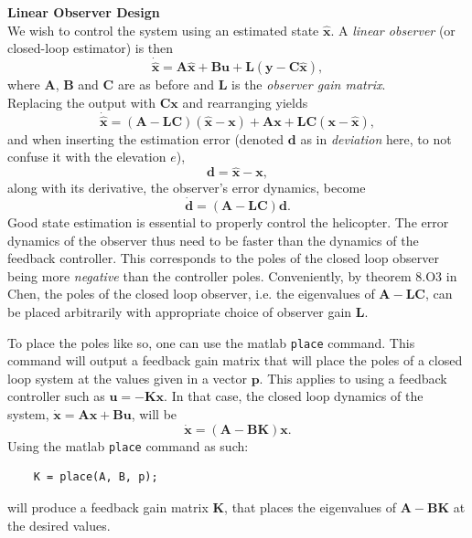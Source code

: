 \textbf{Linear Observer Design}\\
We wish to control the system using an estimated state $\mathbf{\hat{x}}$. A \textit{linear observer} (or closed-loop estimator) is then
\begin{equation}
    \label{eq:observer}
    \mathbf{\dot{\hat{x}}} = \mathbf{A\hat{x}} + \mathbf{Bu} + \mathbf{L} (\mathbf{y} - \mathbf{C\hat{x}}),
\end{equation}
where $\mathbf A$, $\mathbf B$ and $\mathbf C$ are as before and $\mathbf L$ is the \textit{observer gain matrix}. \\
Replacing the output with $\mathbf{C}\mathbf{x}$ and rearranging yields
\begin{equation*}
   \mathbf{\dot{\hat{x}}} = (\mathbf{A} - \mathbf{LC})(\mathbf{\hat{x}} - \mathbf{x}) + \mathbf{Ax} + \mathbf{LC}(\mathbf{x} - \mathbf{\hat{x}}),
\end{equation*}
and when inserting the estimation error (denoted $\mathbf{d}$ as in \textit{deviation} here, to not confuse it with the elevation $e$), 
\begin{equation}
    \mathbf{d} = \hat{\mathbf{x}} - \mathbf{x} \label{eq:est_error},
\end{equation}
along with its derivative, the observer's error dynamics, become
\begin{equation}
    \mathbf{\dot{d}} = (\mathbf{A} - \mathbf{LC})\mathbf{d}. \label{eq:observer_error_sys}
\end{equation}
Good state estimation is essential to properly control the helicopter. The error dynamics of the observer thus need to be faster than the dynamics of the feedback controller. This corresponds to the poles of the closed loop observer being more \textit{negative} than the controller poles. Conveniently, by theorem 8.O3 in Chen, the poles of the closed loop observer, i.e. the eigenvalues of $\mathbf{A} - \mathbf{LC}$, can be placed arbitrarily with appropriate choice of observer gain $\mathbf{L}$.\cite{Chen2014}

To place the poles like so, one can use the matlab \texttt{place} command. This command will output a feedback gain matrix that will place the poles of a closed loop system at the values given in a vector $\mathbf{p}$.
This applies to using a feedback controller such as $\mathbf{u} = -\mathbf{Kx}$. In that case, the closed loop dynamics of the system, $\mathbf{\dot{x}} = \mathbf{Ax} + \mathbf{Bu}$, will be
\begin{equation*}
    \mathbf{\dot{x}} = (\mathbf{A} - \mathbf{BK})\mathbf{x}.
\end{equation*}
 Using the  matlab \texttt{place} command as such:
\begin{verbatim}
    K = place(A, B, p);
\end{verbatim}
will produce a feedback gain matrix $\mathbf{K}$, that places the eigenvalues of $\mathbf{A} - \mathbf{BK}$ at the desired values.\cite{MathWorks2018}


